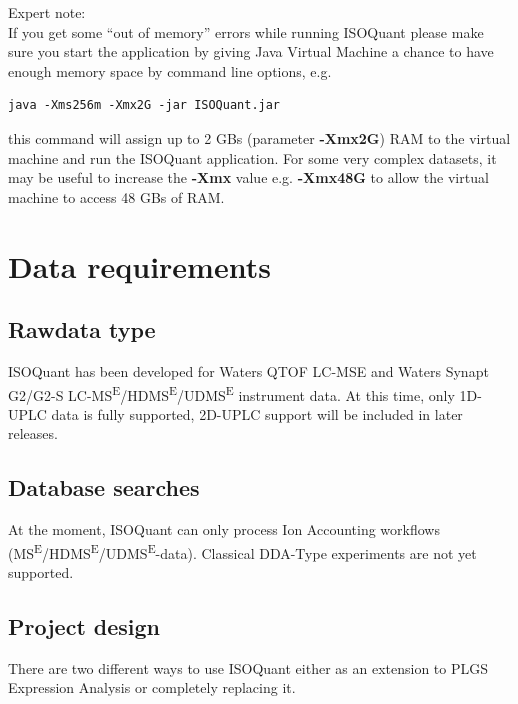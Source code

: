 \documentclass[]{article}
\begin{document}
Expert note:\\
If you get some ``out of memory'' errors while running ISOQuant please
make sure you start the application by giving Java Virtual Machine a
chance to have enough memory space by command line options, e.g.

\begin{lstlisting}
java -Xms256m -Xmx2G -jar ISOQuant.jar
\end{lstlisting}

this command will assign up to 2 GBs (parameter \textbf{-Xmx2G}) RAM to
the virtual machine and run the ISOQuant application. For some very
complex datasets, it may be useful to increase the \textbf{-Xmx} value
e.g. \textbf{-Xmx48G} to allow the virtual machine to access 48 GBs of
RAM.

\clearpage

\section{Data requirements}\label{data-requirements}

\subsection{Rawdata type}\label{rawdata-type}

ISOQuant has been developed for Waters QTOF LC-MSE and Waters Synapt
G2/G2-S
LC-MS\textsuperscript{E}/HDMS\textsuperscript{E}/UDMS\textsuperscript{E}
instrument data. At this time, only 1D-UPLC data is fully supported,
2D-UPLC support will be included in later releases.

\subsection{Database searches}\label{database-searches}

At the moment, ISOQuant can only process Ion Accounting workflows
(MS\textsuperscript{E}/HDMS\textsuperscript{E}/UDMS\textsuperscript{E}-data).
Classical DDA-Type experiments are not yet supported.

\subsection{Project design}\label{project-design}

There are two different ways to use ISOQuant either as an extension to
PLGS Expression Analysis or completely replacing it.
\end{document}
